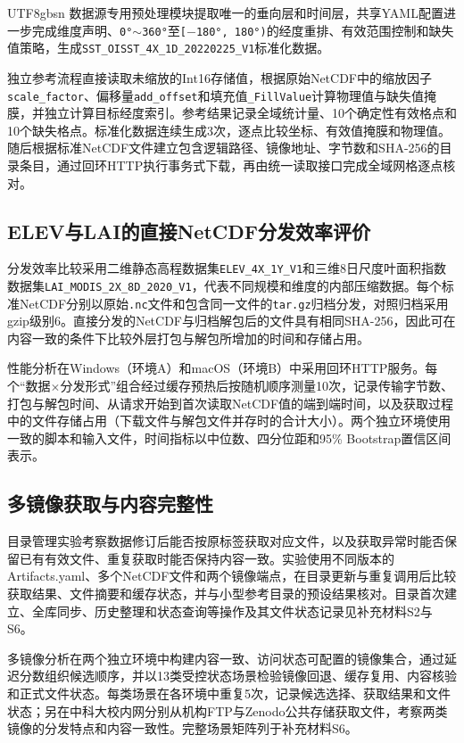\documentclass[numdoi]{chinese}
\begin{document}
\begin{CJK}{UTF8}{gbsn}
数据源专用预处理模块提取唯一的垂向层和时间层，共享YAML配置进一步完成维度声明、\texttt{0°\ensuremath{\sim}360°}至\texttt{[\ensuremath{-}180°, 180°)}的经度重排、有效范围控制和缺失值策略，生成\nolinkurl{SST_OISST_4X_1D_20220225_V1}标准化数据。

独立参考流程直接读取未缩放的Int16存储值，根据原始NetCDF中的缩放因子\nolinkurl{scale_factor}、偏移量\nolinkurl{add_offset}和填充值\nolinkurl{_FillValue}计算物理值与缺失值掩膜，并独立计算目标经度索引。参考结果记录全域统计量、10个确定性有效格点和10个缺失格点。标准化数据连续生成3次，逐点比较坐标、有效值掩膜和物理值。随后根据标准NetCDF文件建立包含逻辑路径、镜像地址、字节数和SHA-256的目录条目，通过回环HTTP执行事务式下载，再由统一读取接口完成全域网格逐点核对。

\subsection{ELEV与LAI的直接NetCDF分发效率评价}
分发效率比较采用二维静态高程数据集\nolinkurl{ELEV_4X_1Y_V1}和三维8日尺度叶面积指数数据集\nolinkurl{LAI_MODIS_2X_8D_2020_V1}，代表不同规模和维度的内部压缩数据。每个标准NetCDF分别以原始\nolinkurl{.nc}文件和包含同一文件的\nolinkurl{tar.gz}归档分发，对照归档采用gzip级别6。直接分发的NetCDF与归档解包后的文件具有相同SHA-256，因此可在内容一致的条件下比较外层打包与解包所增加的时间和存储占用。

性能分析在Windows（环境A）和macOS（环境B）中采用回环HTTP服务。每个“数据\ensuremath{\times}分发形式”组合经过缓存预热后按随机顺序测量10次，记录传输字节数、打包与解包时间、从请求开始到首次读取NetCDF值的端到端时间，以及获取过程中的文件存储占用（下载文件与解包文件并存时的合计大小）。两个独立环境使用一致的脚本和输入文件，时间指标以中位数、四分位距和95\% Bootstrap置信区间表示。

\subsection{多镜像获取与内容完整性}
目录管理实验考察数据修订后能否按原标签获取对应文件，以及获取异常时能否保留已有有效文件、重复获取时能否保持内容一致。实验使用不同版本的Artifacts.yaml、多个NetCDF文件和两个镜像端点，在目录更新与重复调用后比较获取结果、文件摘要和缓存状态，并与小型参考目录的预设结果核对。目录首次建立、全库同步、历史整理和状态查询等操作及其文件状态记录见补充材料S2与S6。

多镜像分析在两个独立环境中构建内容一致、访问状态可配置的镜像集合，通过延迟分数组织候选顺序，并以13类受控状态场景检验镜像回退、缓存复用、内容核验和正式文件状态。每类场景在各环境中重复5次，记录候选选择、获取结果和文件状态；另在中科大校内网分别从机构FTP与Zenodo公共存储获取文件，考察两类镜像的分发特点和内容一致性。完整场景矩阵列于补充材料S6。


\end{CJK}
\end{document}
